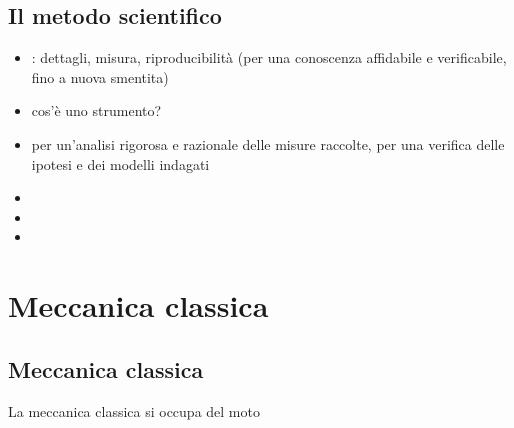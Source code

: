 \documentclass[letterpaper,10pt,italian]{jupyterBook}
\begin{document}
\chapter{Il metodo scientifico}
\label{\detokenize{ch/intro/scientific-method:il-metodo-scientifico}}\label{\detokenize{ch/intro/scientific-method:physics-hs-intro-scientific-method}}\label{\detokenize{ch/intro/scientific-method::doc}}\begin{itemize}
\item {} 
\sphinxAtStartPar
{}: dettagli, misura, riproducibilità (per una conoscenza affidabile e verificabile, fino a nuova smentita)

\item {} 
\sphinxAtStartPar
{} cos’è uno strumento?

\item {} 
\sphinxAtStartPar
{} per un’analisi rigorosa e razionale delle misure raccolte, per una verifica delle ipotesi e dei modelli indagati

\end{itemize}

\sphinxAtStartPar
{}
\begin{itemize}
\item {} 
\sphinxAtStartPar
{}

\item {} 
\sphinxAtStartPar
{}

\item {} 
\sphinxAtStartPar
{}

\end{itemize}

\sphinxstepscope


\part{Meccanica classica}

\sphinxstepscope


\chapter{Meccanica classica}
\label{\detokenize{ch/mechanics:meccanica-classica}}\label{\detokenize{ch/mechanics:physics-hs-mechanics}}\label{\detokenize{ch/mechanics::doc}}
\sphinxAtStartPar
La meccanica classica si occupa del moto 
\end{document}
